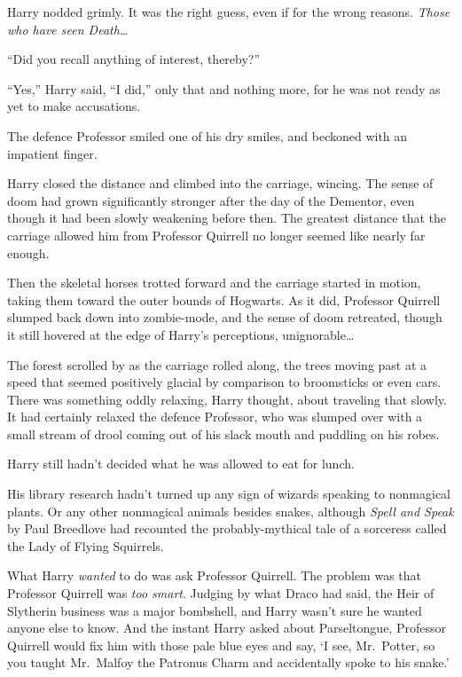 Harry nodded grimly. It was the right guess, even if for the wrong
reasons. \emph{Those who have seen Death\ldots{}}

``Did you recall anything of interest, thereby?''

``Yes,'' Harry said, ``I did,'' only that and nothing more, for he was
not ready as yet to make accusations.

The defence Professor smiled one of his dry smiles, and beckoned with an
impatient finger.

Harry closed the distance and climbed into the carriage, wincing. The
sense of doom had grown significantly stronger after the day of the
Dementor, even though it had been slowly weakening before then. The
greatest distance that the carriage allowed him from Professor Quirrell
no longer seemed like nearly far enough.

Then the skeletal horses trotted forward and the carriage started in
motion, taking them toward the outer bounds of Hogwarts. As it did,
Professor Quirrell slumped back down into zombie-mode, and the sense of
doom retreated, though it still hovered at the edge of Harry's
perceptions, unignorable\ldots{}

The forest scrolled by as the carriage rolled along, the trees moving
past at a speed that seemed positively glacial by comparison to
broomsticks or even cars. There was something oddly relaxing, Harry
thought, about traveling that slowly. It had certainly relaxed the
defence Professor, who was slumped over with a small stream of drool
coming out of his slack mouth and puddling on his robes.

Harry still hadn't decided what he was allowed to eat for lunch.

His library research hadn't turned up any sign of wizards speaking to
nonmagical plants. Or any other nonmagical animals besides snakes,
although \emph{Spell and Speak} by Paul Breedlove had recounted the
probably-mythical tale of a sorceress called the Lady of Flying
Squirrels.

What Harry \emph{wanted} to do was ask Professor Quirrell. The problem
was that Professor Quirrell was \emph{too smart}. Judging by what Draco
had said, the Heir of Slytherin business was a major bombshell, and
Harry wasn't sure he wanted anyone else to know. And the instant Harry
asked about Parseltongue, Professor Quirrell would fix him with those
pale blue eyes and say, `I see, Mr.~Potter, so you taught Mr.~Malfoy the
Patronus Charm and accidentally spoke to his snake.'

